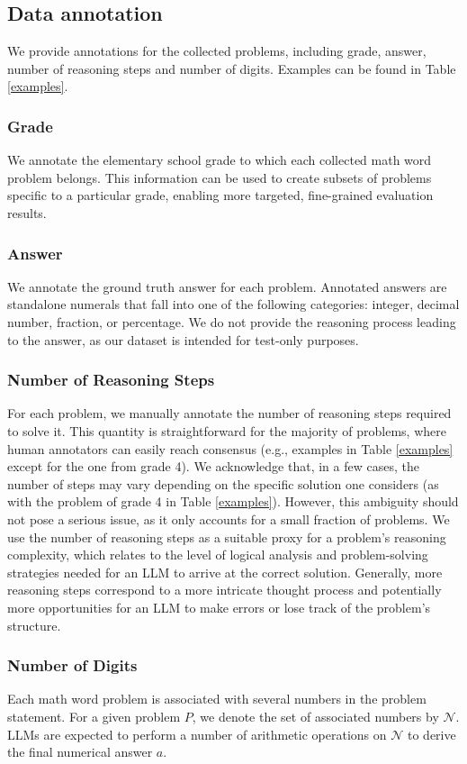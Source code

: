 \subsection{Data annotation} We provide annotations for the collected problems, including grade, answer, number of reasoning steps and number of digits. Examples can be found in Table \ref{examples}.
\subsubsection{Grade}
We annotate the elementary school grade to which each collected math word problem belongs. This information can be used to create subsets of problems specific to a particular grade, enabling more targeted, fine-grained evaluation results. 

\subsubsection{Answer}
We annotate the ground truth answer for each problem. Annotated answers are standalone numerals that fall into one of the following categories: integer, decimal number, fraction, or percentage. We do not provide the reasoning process leading to the answer, as our dataset is intended for test-only purposes. 

\subsubsection{Number of Reasoning Steps} For each problem, we manually annotate the number of reasoning steps required to solve it. This quantity is straightforward for the majority of problems, where human annotators can easily reach consensus (e.g., examples in Table \ref{examples} except for the one from grade 4). We acknowledge that, in a few cases, the number of steps may vary depending on the specific solution one considers (as with the problem of grade 4 in Table \ref{examples}). However, this ambiguity should not pose a serious issue, as it only accounts for a small fraction of problems. We use the number of reasoning steps as a suitable proxy for a problem's reasoning complexity, which relates to the level of logical analysis and problem-solving strategies needed for an LLM to arrive at the correct solution. Generally, more reasoning steps correspond to a more intricate thought process and potentially more opportunities for an LLM to make errors or lose track of the problem's structure.

\subsubsection{Number of Digits} Each math word problem is associated with several numbers in the problem statement. For a given problem $P$, we denote the set of associated numbers by $\mathcal{N}$. LLMs are expected to perform a number of arithmetic operations on $\mathcal{N}$ to derive the final numerical answer $a$.

